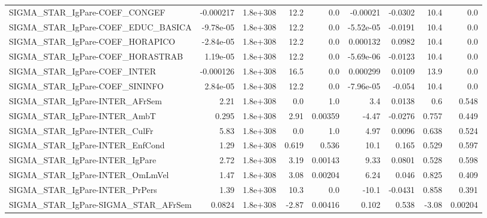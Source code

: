 \begin{tabular}{lrrrrrrrr}
SIGMA\_STAR\_IgPare-COEF\_CONGEF         &   -0.000217 &     1.8e+308 &    12.2 &      0.0 &   -0.00021 &     -0.0302 &         10.4 &           0.0 \\
SIGMA\_STAR\_IgPare-COEF\_EDUC\_BASICA    &   -9.78e-05 &     1.8e+308 &    12.2 &      0.0 &  -5.52e-05 &     -0.0191 &         10.4 &           0.0 \\
SIGMA\_STAR\_IgPare-COEF\_HORAPICO       &   -2.84e-05 &     1.8e+308 &    12.2 &      0.0 &   0.000132 &      0.0982 &         10.4 &           0.0 \\
SIGMA\_STAR\_IgPare-COEF\_HORASTRAB      &    1.19e-05 &     1.8e+308 &    12.2 &      0.0 &  -5.69e-06 &     -0.0123 &         10.4 &           0.0 \\
SIGMA\_STAR\_IgPare-COEF\_INTER          &   -0.000126 &     1.8e+308 &    16.5 &      0.0 &   0.000299 &      0.0109 &         13.9 &           0.0 \\
SIGMA\_STAR\_IgPare-COEF\_SININFO        &    2.84e-05 &     1.8e+308 &    12.2 &      0.0 &  -7.96e-05 &      -0.054 &         10.4 &           0.0 \\
SIGMA\_STAR\_IgPare-INTER\_AFrSem        &        2.21 &     1.8e+308 &     0.0 &      1.0 &        3.4 &      0.0138 &          0.6 &         0.548 \\
SIGMA\_STAR\_IgPare-INTER\_AmbT          &       0.295 &     1.8e+308 &    2.91 &  0.00359 &      -4.47 &     -0.0276 &        0.757 &         0.449 \\
SIGMA\_STAR\_IgPare-INTER\_CulFr         &        5.83 &     1.8e+308 &     0.0 &      1.0 &       4.97 &      0.0096 &        0.638 &         0.524 \\
SIGMA\_STAR\_IgPare-INTER\_EnfCond       &        1.29 &     1.8e+308 &   0.619 &    0.536 &       10.1 &       0.165 &        0.529 &         0.597 \\
SIGMA\_STAR\_IgPare-INTER\_IgPare        &        2.72 &     1.8e+308 &    3.19 &  0.00143 &       9.33 &      0.0801 &        0.528 &         0.598 \\
SIGMA\_STAR\_IgPare-INTER\_OmLmVel       &        1.47 &     1.8e+308 &    3.08 &  0.00204 &       6.24 &       0.046 &        0.825 &         0.409 \\
SIGMA\_STAR\_IgPare-INTER\_PrPers        &        1.39 &     1.8e+308 &    10.3 &      0.0 &      -10.1 &     -0.0431 &        0.858 &         0.391 \\
SIGMA\_STAR\_IgPare-SIGMA\_STAR\_AFrSem   &      0.0824 &     1.8e+308 &   -2.87 &  0.00416 &      0.102 &       0.538 &        -3.08 &       0.00204 \\

\end{tabular}
